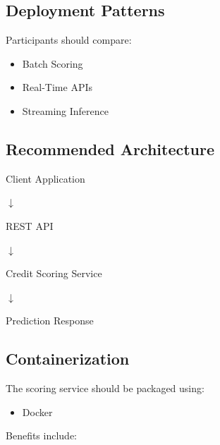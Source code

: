 \subsection{Deployment Patterns}

Participants should compare:

\begin{itemize}
    \item Batch Scoring
    \item Real-Time APIs
    \item Streaming Inference
\end{itemize}

\subsection{Recommended Architecture}

\begin{center}
Client Application
\end{center}

\begin{center}
$\downarrow$
\end{center}

\begin{center}
REST API
\end{center}

\begin{center}
$\downarrow$
\end{center}

\begin{center}
Credit Scoring Service
\end{center}

\begin{center}
$\downarrow$
\end{center}

\begin{center}
Prediction Response
\end{center}

\subsection{Containerization}

The scoring service should be packaged using:

\begin{itemize}
    \item Docker
\end{itemize}

Benefits include:

